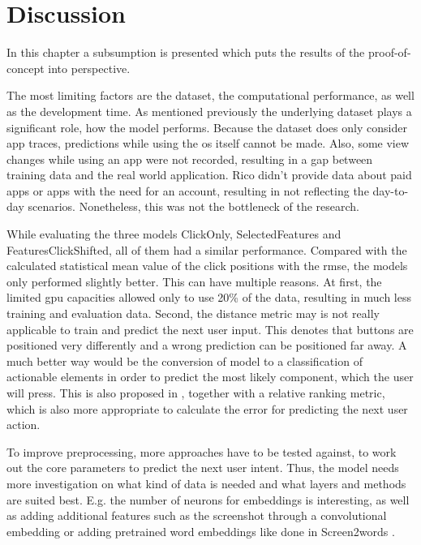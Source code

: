 \chapter{Discussion}

In this chapter a subsumption is presented which puts the results of the proof-of-concept into perspective.

The most limiting factors are the dataset, the computational performance, as well as the development time.
As mentioned previously the underlying dataset plays a significant role, how the model performs.
Because the dataset does only consider app traces, predictions while using the \gls{os} itself cannot be made.
Also, some view changes while using an app were not recorded, resulting in a gap between training data and the real world application.
Rico didn't provide data about paid apps or apps with the need for an account, resulting in not reflecting the day-to-day scenarios.
Nonetheless, this was not the bottleneck of the research.

While evaluating the three models ClickOnly, SelectedFeatures and FeaturesClickShifted, all of them had a similar performance.
Compared with the calculated statistical mean value of the click positions with the \gls{rmse}, the models only performed slightly better.
This can have multiple reasons.
At first, the limited \gls{gpu} capacities allowed only to use 20\% of the data, resulting in much less training and evaluation data.
Second, the distance metric may is not really applicable to train and predict the next user input.
This denotes that buttons are positioned very differently and a wrong prediction can be positioned far away.
A much better way would be the conversion of model to a classification of actionable elements in order to predict the most likely component, which the user will press.
This is also proposed in \cite{zhou2021large}, together with a relative ranking metric, which is also more appropriate to calculate the error for predicting the next user action.

To improve preprocessing, more approaches have to be tested against, to work out the core parameters to predict the next user intent.
Thus, the model needs more investigation on what kind of data is needed and what layers and methods are suited best.
E.g. the number of neurons for embeddings is interesting, as well as adding additional features such as the screenshot through a convolutional embedding or adding pretrained word embeddings like done in Screen2words \cite{wang2021screen2words}.

